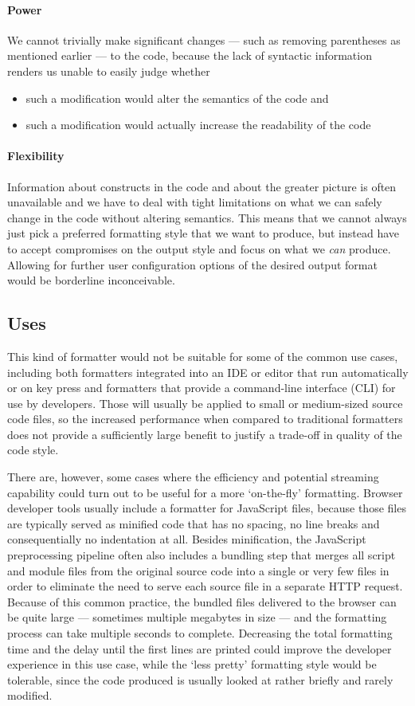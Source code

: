 \paragraph{Power}
We cannot trivially make significant changes --- such as removing parentheses as mentioned earlier ---
to the code, because the lack of syntactic information renders us unable to easily judge whether
\begin{itemize}
  \item such a modification would alter the semantics of the code and
  \item such a modification would actually increase the readability of the code
\end{itemize}

\paragraph{Flexibility}
Information about constructs in the code and about the greater picture is often unavailable and
we have to deal with tight limitations on what we can safely change in the code without altering semantics.
This means that we cannot always just pick a preferred formatting style that we want to produce,
but instead have to accept compromises on the output style and focus on what we \textit{can} produce.
Allowing for further user configuration options of the desired output format would be borderline inconceivable.

\subsection{Uses}
This kind of formatter would not be suitable for some of the common use cases, including both
formatters integrated into an IDE or editor that run automatically or on key press and
formatters that provide a command-line interface (CLI) for use by developers.
Those will usually be applied to small or medium-sized source code files,
so the increased performance when compared to traditional formatters does not provide
a sufficiently large benefit to justify a trade-off in quality of the code style.

There are, however, some cases where the efficiency and potential streaming capability could
turn out to be useful for a more `on-the-fly' formatting.
Browser developer tools usually include a formatter for JavaScript files,
because those files are typically served as minified code that has
no spacing, no line breaks and consequentially no indentation at all.
Besides minification, the JavaScript preprocessing pipeline often also includes a bundling step
that merges all script and module files from the original source code into a single or very few
files in order to eliminate the need to serve each source file in a separate HTTP request.
Because of this common practice, the bundled files delivered to the browser can be quite large ---
sometimes multiple megabytes in size --- and the formatting process can take multiple seconds to complete.
Decreasing the total formatting time and the delay until the first lines are printed
could improve the developer experience in this use case,
while the `less pretty' formatting style would be tolerable,
since the code produced is usually looked at rather briefly and rarely modified.

